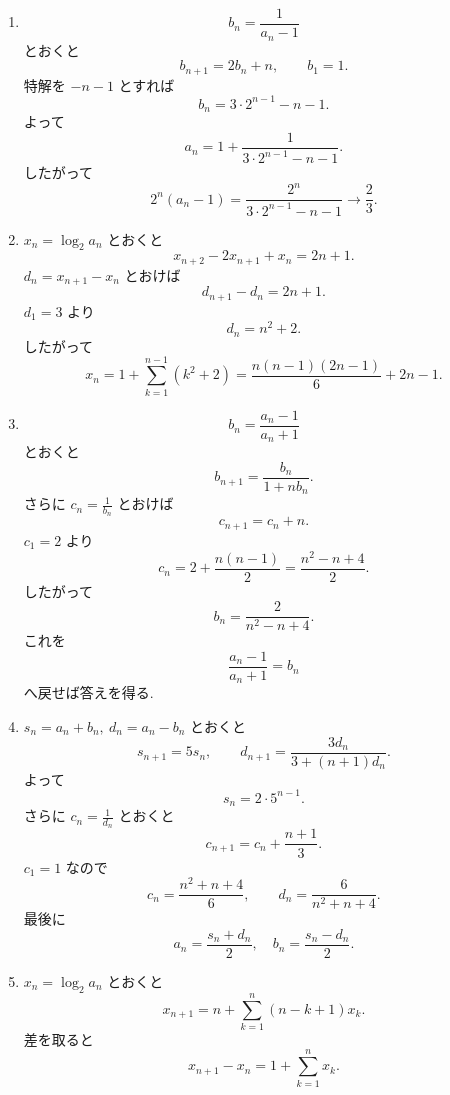 \begin{enumerate}[label=\textbf{問\arabic*.},leftmargin=3.8em,format=\bookitemlink{practice-advanced}{solution}{problem}]
          \[
            a_n=\frac{s_n+d_n}{2},\qquad
            b_n=\frac{s_n-d_n}{2}.
          \]
        \item \[
            b_n=\frac1{a_n-1}
          \]
              とおくと
          \[
            b_{n+1}=2b_n+n,\qquad b_1=1.
          \]
              特解を \(-n-1\) とすれば
          \[
            b_n=3\cdot2^{n-1}-n-1.
          \]
              よって
          \[
            a_n=1+\frac1{3\cdot2^{n-1}-n-1}.\]
              したがって
          \[
            2^n(a_n-1)
            =\frac{2^n}{3\cdot2^{n-1}-n-1}\to\frac23.
          \]
        \item \(x_n=\log_2a_n\) とおくと
          \[
            x_{n+2}-2x_{n+1}+x_n=2n+1.
          \]
              \(d_n=x_{n+1}-x_n\) とおけば
          \[
            d_{n+1}-d_n=2n+1.
          \]
              \(d_1=3\) より
          \[
            d_n=n^2+2.
          \]
              したがって
          \[
            x_n=1+\sum_{k=1}^{n-1}(k^2+2)
            =\frac{n(n-1)(2n-1)}6+2n-1.
          \]
        \item \[
            b_n=\frac{a_n-1}{a_n+1}
          \]
              とおくと
          \[
            b_{n+1}=\frac{b_n}{1+nb_n}.
          \]
              さらに \(c_n=\displaystyle \frac{1}{b_n}\) とおけば
          \[
            c_{n+1}=c_n+n.
          \]
              \(c_1=2\) より
          \[
            c_n=2+\frac{n(n-1)}2
            =\frac{n^2-n+4}{2}.
          \]
              したがって
          \[
            b_n=\frac2{n^2-n+4}.
          \]
              これを
          \[
            \frac{a_n-1}{a_n+1}=b_n
          \]
              へ戻せば答えを得る.
        \item \(s_n=a_n+b_n,\ d_n=a_n-b_n\) とおくと
          \[
            s_{n+1}=5s_n,\qquad
            d_{n+1}=\frac{3d_n}{3+(n+1)d_n}.
          \]
              よって
          \[
            s_n=2\cdot5^{n-1}.
          \]
              さらに \(c_n=\displaystyle \frac{1}{d_n}\) とおくと
          \[
            c_{n+1}=c_n+\frac{n+1}{3}.
          \]
              \(c_1=1\) なので
          \[
            c_n=\frac{n^2+n+4}{6},
            \qquad
            d_n=\frac6{n^2+n+4}.
          \]
              最後に
          \[
            a_n=\frac{s_n+d_n}{2},\quad b_n=\frac{s_n-d_n}{2}.
          \]
        \item \(x_n=\log_2a_n\) とおくと
          \[
            x_{n+1}
            =n+\sum_{k=1}^{n}(n-k+1)x_k.
          \]
              差を取ると
          \[
            x_{n+1}-x_n=1+\sum_{k=1}^{n}x_k.
\]
\end{enumerate}
